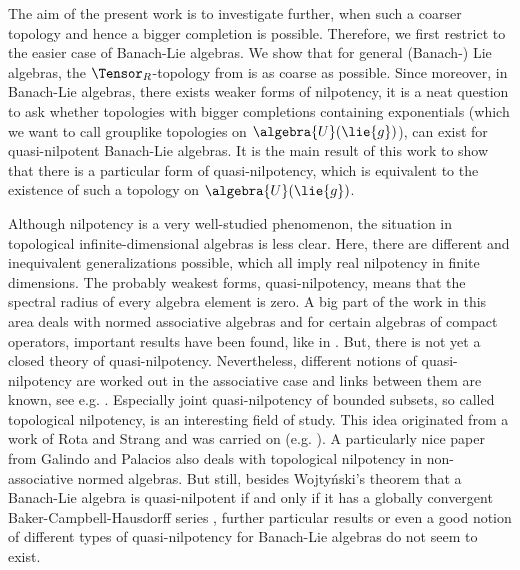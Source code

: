 \documentclass[
11pt,                          %
english                        %
]{article}
\begin{document}
The aim of the present work is to investigate further, when such a coarser topology 
and hence a bigger completion is possible. Therefore, we first restrict to the easier 
case of Banach-Lie algebras. We show that for general (Banach-) Lie algebras, the 
$\Tensor_R$-topology from \cite{esposito.stapor.waldmann:2015a:pre} is as coarse as 
possible. Since moreover, in Banach-Lie algebras, there exists weaker forms of 
nilpotency, it is a neat question to ask whether topologies with bigger completions 
containing exponentials (which we want to call grouplike topologies on $\algebra{U}
(\lie{g})$), can exist for quasi-nilpotent Banach-Lie algebras. It is the main result 
of this work to show that there is a particular form of quasi-nilpotency, which is 
equivalent to the existence of such a topology on $\algebra{U}(\lie{g})$.

Although nilpotency is a very well-studied phenomenon, the situation in topological 
infinite-dimensional algebras is less clear. Here, there are different and 
inequivalent generalizations possible, which all imply real nilpotency in finite 
dimensions. The probably weakest forms, quasi-nilpotency, means that the spectral 
radius of every algebra element is zero. A big part of the work in this area deals 
with normed associative algebras and for certain algebras of compact operators, 
important results have been found, like in \cite{shulman.turovskii:2000a}. But, there 
is not yet a closed theory of quasi-nilpotency. Nevertheless, different notions of 
quasi-nilpotency are worked out in the associative case and links between them are 
known, see e.g. \cite{dixon:1991a, mueller:1994a, dixon.mueller:1992a}. Especially 
joint quasi-nilpotency of bounded subsets, so called topological nilpotency, is an 
interesting field of study. This idea originated from a work of Rota and Strang 
\cite{rota.strang:1960a} and was carried on (e.g. \cite{mueller:1997a}). A 
particularly nice paper from Galindo and Palacios \cite{galindo.palacios:2012a} also 
deals with topological nilpotency in non-associative normed algebras. But still, 
besides Wojty\'nski's theorem that a Banach-Lie algebra is quasi-nilpotent if and 
only if it has a globally convergent Baker-Campbell-Hausdorff series 
\cite{wojtynski:1998a}, further particular results or even a good notion of different 
types of quasi-nilpotency for Banach-Lie algebras do not seem to exist.
\end{document}
